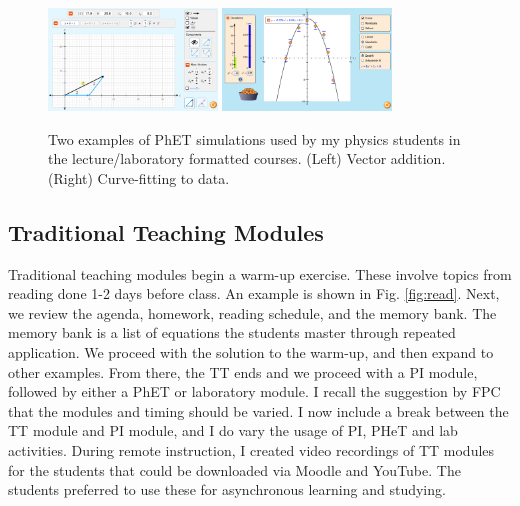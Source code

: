 \documentclass[../../../main.tex]{subfiles}
\begin{document}
\begin{figure}
\centering
\includegraphics[width=0.4\textwidth]{figures/phet1.png}
\includegraphics[width=0.4\textwidth]{figures/phet2.png}
\caption{\label{fig:phet} Two examples of PhET simulations used by my physics students in the lecture/laboratory formatted courses.  (Left) Vector addition. (Right) Curve-fitting to data.}
\end{figure}

\subsection{Traditional Teaching Modules}
\label{sec:tt}

Traditional teaching modules begin a warm-up exercise.  These involve topics from reading done 1-2 days before class.  An example is shown in Fig. \ref{fig:read}.  Next, we review the agenda, homework, reading schedule, and the memory bank.  The memory bank is a list of equations the students master through repeated application.  We proceed with the solution to the warm-up, and then expand to other examples.  From there, the TT ends and we proceed with a PI module, followed by either a PhET or laboratory module.  I recall the suggestion by FPC that the modules and timing should be varied.  I now include a break between the TT module and PI module, and I do vary the usage of PI, PHeT and lab activities.  During remote instruction, I created video recordings of TT modules for the students that could be downloaded via Moodle and YouTube.  The students preferred to use these for asynchronous learning and studying.
\end{document}
